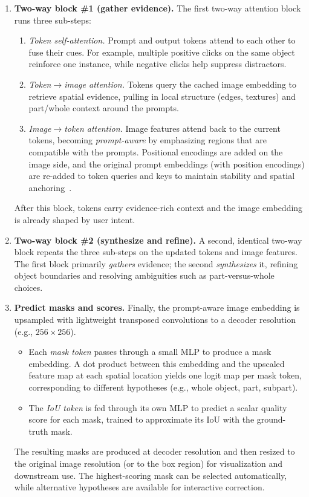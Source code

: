 \begin{enrichment}
\begin{enrichment}
\begin{enumerate}
			\item \textbf{Two-way block \#1 (gather evidence).}
			The first two-way attention block runs three sub-steps:
			\begin{enumerate}
				\item \emph{Token self-attention.} Prompt and output tokens attend to each other to fuse their cues. For example, multiple positive clicks on the same object reinforce one instance, while negative clicks help suppress distractors.
				\item \emph{Token$\rightarrow$image attention.} Tokens query the cached image embedding to retrieve spatial evidence, pulling in local structure (edges, textures) and part/whole context around the prompts.
				\item \emph{Image$\rightarrow$token attention.} Image features attend back to the current tokens, becoming \emph{prompt-aware} by emphasizing regions that are compatible with the prompts. Positional encodings are added on the image side, and the original prompt embeddings (with position encodings) are re-added to token queries and keys to maintain stability and spatial anchoring~\cite{kirillov2023_sam}.
			\end{enumerate}
			After this block, tokens carry evidence-rich context and the image embedding is already shaped by user intent.
			
			\newpage
			
			\item \textbf{Two-way block \#2 (synthesize and refine).}
			A second, identical two-way block repeats the three sub-steps on the updated tokens and image features. The first block primarily \emph{gathers} evidence; the second \emph{synthesizes} it, refining object boundaries and resolving ambiguities such as part-versus-whole choices.
			
			\item \textbf{Predict masks and scores.}
			Finally, the prompt-aware image embedding is upsampled with lightweight transposed convolutions to a decoder resolution (e.g., \(256 \times 256\)).
			\begin{itemize}
				\item Each \emph{mask token} passes through a small MLP to produce a mask embedding. A dot product between this embedding and the upscaled feature map at each spatial location yields one logit map per mask token, corresponding to different hypotheses (e.g., whole object, part, subpart).
				\item The \emph{IoU token} is fed through its own MLP to predict a scalar quality score for each mask, trained to approximate its IoU with the ground-truth mask.
			\end{itemize}
			The resulting masks are produced at decoder resolution and then resized to the original image resolution (or to the box region) for visualization and downstream use. The highest-scoring mask can be selected automatically, while alternative hypotheses are available for interactive correction.
		\end{enumerate}
		

\end{enrichment}
\end{enrichment}
